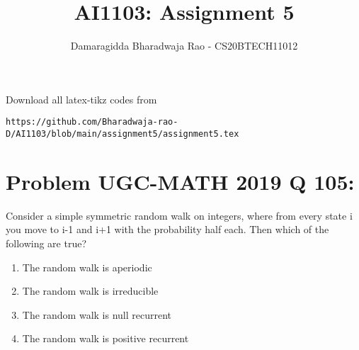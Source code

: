 \documentclass[journal,12pt,twocolumn]{IEEEtran}
\begin{document}
     \def\rightbox#1{\makebox[0in][r]{#1}}
     \def\centbox#1{\makebox[0in]{#1}}
     \def\topbox#1{\raisebox{-\baselineskip}[0in][0in]{#1}}
     \def\midbox#1{\raisebox{-0.5\baselineskip}[0in][0in]{#1}}
\vspace{3cm}
\title{AI1103: Assignment 5}
\author{Damaragidda Bharadwaja Rao - CS20BTECH11012}
\maketitle
\newpage
\bigskip
\renewcommand{\thefigure}{\theenumi}
\renewcommand{\thetable}{\theenumi}
Download all latex-tikz codes from 
\begin{lstlisting}
https://github.com/Bharadwaja-rao-D/AI1103/blob/main/assignment5/assignment5.tex
\end{lstlisting}
\section*{Problem UGC-MATH 2019 Q 105:}
Consider a simple symmetric random walk on integers, where from every state i you move to i-1 and i+1 with the probability half each. Then which of the following are true?
\begin{enumerate}
\item The random walk is aperiodic
\item The random walk is irreducible
\item The random walk is null recurrent 
\item The random walk is positive recurrent
\end{enumerate}
\end{document}
